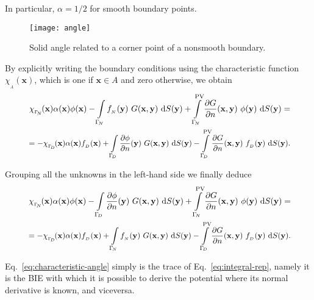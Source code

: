 In particular, $\alpha=1/2$ for smooth boundary points.

\begin{figure}
  \begin{center}
    \texttt{[image: angle]}    %
    \caption{Solid angle related to a corner point of a nonsmooth boundary.} 
    \label{fig:angle}
  \end{center}
\end{figure}

By explicitly writing the boundary conditions using the characteristic function $\chi_{_A}(\mathbf{x})$, which is one if $\mathbf{x}\in A$ and zero otherwise, we obtain
\begin{equation*}
\begin{gathered}
\resizebox{.9\hsize}{!}{
$\chi_{_{\Gamma_{\!N}}}\!(\mathbf{x})\alpha(\mathbf{x})\phi(\mathbf{x}) - \displaystyle\int_{\Gamma_{\!N}} f_{_N}(\mathbf{y})\ G(\mathbf{x},\mathbf{y})\ \mathrm{d}S(\mathbf{y}) + \int_{\Gamma_{\!N}}^{\text{PV}} \frac{\partial G}{\partial n}(\mathbf{x},\mathbf{y})\ \phi(\mathbf{y}) \ \mathrm{d}S(\mathbf{y})=$} \\
\resizebox{.9\hsize}{!}{
$= - \chi_{_{\Gamma_{\!D}}}\!(\mathbf{x})\alpha(\mathbf{x})f_{_D}(\mathbf{x}) + \displaystyle\int_{\Gamma_{\!D}} \frac{\partial\phi}{\partial n}(\mathbf{y})\ G(\mathbf{x},\mathbf{y})\ \mathrm{d}S(\mathbf{y}) - \int_{\Gamma_{\!D}}^{\text{PV}} \frac{\partial G}{\partial n}(\mathbf{x},\mathbf{y})\ f_{_D}(\mathbf{y}) \ \mathrm{d}S(\mathbf{y}).$}
\end{gathered}
\end{equation*}

Grouping all the unknowns in the left-hand side we finally deduce
\begin{equation}
\label{eq:characteristic-angle}
\begin{gathered}
\resizebox{.9\hsize}{!}{
$\chi_{_{\Gamma_{\!N}}}\!(\mathbf{x})\alpha(\mathbf{x})\phi(\mathbf{x}) - \displaystyle\int_{\Gamma_{\!D}} \frac{\partial \phi}{\partial n}(\mathbf{y})\ G(\mathbf{x},\mathbf{y})\ \mathrm{d}S(\mathbf{y}) + \int_{\Gamma_{\!N}}^{\text{PV}} \frac{\partial G}{\partial n}(\mathbf{x},\mathbf{y})\ \phi(\mathbf{y}) \ \mathrm{d}S(\mathbf{y})=$} \\
\resizebox{.9\hsize}{!}{
$= - \chi_{_{\Gamma_{\!D}}}\!(\mathbf{x})\alpha(\mathbf{x})f_{_D}(\mathbf{x}) + \displaystyle\int_{\Gamma_{\!N}} f_{_N}(\mathbf{y})\ G(\mathbf{x},\mathbf{y})\ \mathrm{d}S(\mathbf{y}) - \int_{\Gamma_{\!D}}^{\text{PV}} \frac{\partial G}{\partial n}(\mathbf{x},\mathbf{y})\ f_{_D}(\mathbf{y}) \ \mathrm{d}S(\mathbf{y}).$}
\end{gathered}
\end{equation}

Eq.~\eqref{eq:characteristic-angle} simply is the trace of Eq.~\eqref{eq:integral-rep}, namely it is the BIE with which it is possible to derive the potential where its normal derivative is known, and viceversa.








